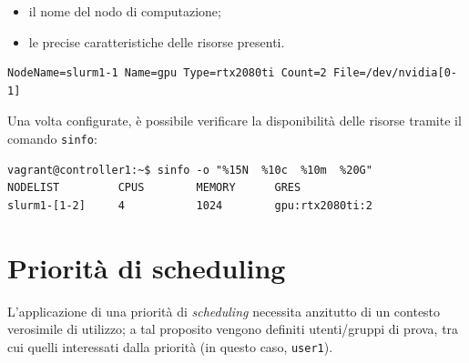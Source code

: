 \documentclass[12pt,a4paper,twoside,openright]{book}
\begin{document}
\begin{itemize}
    \item il nome del nodo di computazione;
    \item le precise caratteristiche delle risorse presenti.
\end{itemize}
\begin{verbatim}
NodeName=slurm1-1 Name=gpu Type=rtx2080ti Count=2 File=/dev/nvidia[0-1]
\end{verbatim}
Una volta configurate, è possibile verificare la disponibilità delle risorse tramite il comando \texttt{sinfo}:
\begin{verbatim}
vagrant@controller1:~$ sinfo -o "%15N  %10c  %10m  %20G"
NODELIST         CPUS        MEMORY      GRES
slurm1-[1-2]     4           1024        gpu:rtx2080ti:2
\end{verbatim}

\section{Priorità di scheduling}
L'applicazione di una priorità di \textit{scheduling} necessita anzitutto di un contesto verosimile di utilizzo; a tal proposito vengono definiti utenti/gruppi di prova, tra cui quelli interessati dalla priorità (in questo caso, \texttt{user1}).
\end{document}
